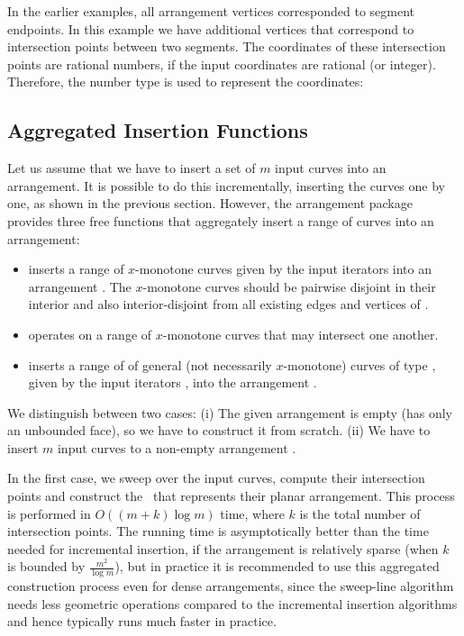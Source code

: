 In the earlier examples, all arrangement vertices corresponded to
segment endpoints. In this example we have additional vertices that
correspond to intersection points between two segments. The
coordinates of these intersection points are rational numbers, if
the input coordinates are rational (or integer). Therefore,
the  number type is used to represent the
coordinates:


\subsection{Aggregated Insertion Functions}
\label{arr_ssec:agg_insert}
%
Let us assume that we have to insert a set of $m$ input curves into an
arrangement. It is possible to do this incrementally, 
inserting the curves one by one, as shown in the previous section.
However, the arrangement package provides three free functions that
aggregately insert a range of curves into an arrangement:
%
\begin{itemize}
\item {} inserts 
a range of $x$-monotone curves given by the input iterators
\ccc{[begin, end)} into an arrangement . The $x$-monotone
curves should be pairwise disjoint in their interior and also
interior-disjoint from all existing edges and vertices of .
%
\item {} operates on
a range of $x$-monotone curves that may intersect one another.
%
\item {} inserts a range of
of general (not necessarily $x$-monotone) curves of type ,
given by the input iterators \ccc{[begin, end)}, into the arrangement
.
\end{itemize}

We distinguish between two cases: (i) The given arrangement
 is empty (has only an unbounded face), so we have to
construct it from scratch. (ii) We have to insert $m$ input curves
to a non-empty arrangement .

In the first case, we sweep over the input curves, compute
their intersection points and construct the \dcel\ that represents
their planar arrangement. This process is performed in
$O\left((m + k)\log m\right)$ time, where $k$ is the total number
of intersection points. The running time is asymptotically better
than the time needed for incremental insertion, if the arrangement
is relatively sparse (when $k$ is bounded by $\frac{m^2}{\log
m}$), but in practice it is recommended to use this aggregated
construction process even for dense arrangements, since the
sweep-line algorithm needs less geometric operations compared to
the incremental insertion algorithms and hence typically runs 
much faster in practice.

